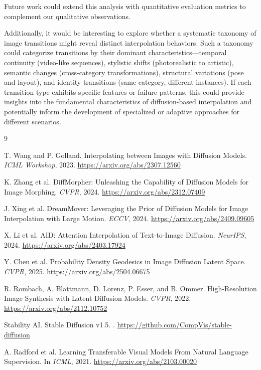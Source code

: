 \documentclass{article}
\begin{document}
Future work could extend this analysis with quantitative
  evaluation metrics to complement our qualitative observations.

  
  Additionally, it would be interesting to explore whether a        
  systematic taxonomy of image transitions might reveal distinct
  interpolation behaviors. Such a taxonomy could categorize         
  transitions by their dominant characteristics—temporal continuity
  (video-like sequences), stylistic shifts (photorealistic to
  artistic), semantic changes (cross-category transformations),
  structural variations (pose and layout), and identity transitions
  (same category, different instances). If each transition type
  exhibits specific features or failure patterns, this could provide
   insights into the fundamental characteristics of diffusion-based
  interpolation and potentially inform the development of
  specialized or adaptive approaches for different scenarios.

\begin{thebibliography}{9}

T. Wang and P. Golland. 
\newblock Interpolating between Images with Diffusion Models.
\newblock \textit{ICML Workshop}, 2023. 
\newblock \url{https://arxiv.org/abs/2307.12560}

K. Zhang et al.
\newblock DiffMorpher: Unleashing the Capability of Diffusion Models for Image Morphing.
\newblock \textit{CVPR}, 2024.
\newblock \url{https://arxiv.org/abs/2312.07409}

J. Xing et al.
\newblock DreamMover: Leveraging the Prior of Diffusion Models for Image Interpolation with Large Motion.
\newblock \textit{ECCV}, 2024.
\newblock \url{https://arxiv.org/abs/2409.09605}

X. Li et al.
\newblock AID: Attention Interpolation of Text-to-Image Diffusion.
\newblock \textit{NeurIPS}, 2024.
\newblock \url{https://arxiv.org/abs/2403.17924}

Y. Chen et al.
\newblock Probability Density Geodesics in Image Diffusion Latent Space.
\newblock \textit{CVPR}, 2025.
\newblock \url{https://arxiv.org/abs/2504.06675}

R. Rombach, A. Blattmann, D. Lorenz, P. Esser, and B. Ommer. 
\newblock High-Resolution Image Synthesis with Latent Diffusion Models. 
\newblock \textit{CVPR}, 2022. 
\newblock \url{https://arxiv.org/abs/2112.10752}

Stability AI. 
\newblock Stable Diffusion v1.5. 
. 
\newblock \url{https://github.com/CompVis/stable-diffusion}

A. Radford et al.
\newblock Learning Transferable Visual Models From Natural Language Supervision.
\newblock In \textit{ICML}, 2021.
\newblock \url{https://arxiv.org/abs/2103.00020}

\end{thebibliography}
\end{document}
